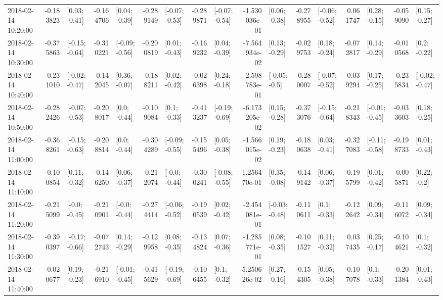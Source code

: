 \begin{tabular}{lrlrlrlrlrlrlrlrl}
2018-02-14 10:20:00 & -0.183823 &   [0.03; -0.41] & -0.164706 &   [0.04; -0.39] & -0.289149 &  [-0.07; -0.53] & -0.289871 &  [-0.07; -0.54] & -1.530036e-01 &   [0.06; -0.38] & -0.278955 &  [-0.06; -0.52] &  0.061747 &   [0.28; -0.15] & -0.059090 &   [0.15; -0.27] \\
2018-02-14 10:30:00 & -0.375863 &  [-0.15; -0.64] & -0.310221 &  [-0.09; -0.56] & -0.200819 &   [0.01; -0.43] & -0.169232 &   [0.04; -0.39] & -7.564934e-02 &   [0.13; -0.29] & -0.029753 &   [0.18; -0.24] & -0.072817 &   [0.14; -0.29] & -0.010568 &    [0.2; -0.22] \\
2018-02-14 10:40:00 & -0.231010 &  [-0.02; -0.47] &  0.142045 &   [0.36; -0.07] & -0.188211 &   [0.02; -0.42] &  0.026398 &   [0.24; -0.18] & -2.598783e-01 &   [-0.05; -0.5] & -0.280007 &  [-0.07; -0.52] & -0.039294 &   [0.17; -0.25] & -0.235834 &  [-0.02; -0.47] \\
2018-02-14 10:50:00 & -0.282426 &  [-0.07; -0.53] & -0.208017 &    [0.0; -0.44] & -0.109084 &    [0.1; -0.33] & -0.413237 &  [-0.19; -0.69] & -6.173205e-02 &   [0.15; -0.28] & -0.373076 &  [-0.15; -0.64] & -0.218343 &  [-0.01; -0.45] & -0.033603 &   [0.18; -0.25] \\
2018-02-14 11:00:00 & -0.368261 &  [-0.15; -0.63] & -0.208814 &    [0.0; -0.44] & -0.304289 &  [-0.09; -0.55] & -0.155496 &   [0.05; -0.38] & -1.566015e-02 &   [0.19; -0.23] & -0.180638 &   [0.03; -0.41] & -0.327083 &  [-0.11; -0.58] & -0.198733 &   [0.01; -0.43] \\
2018-02-14 11:10:00 & -0.100854 &   [0.11; -0.32] & -0.146250 &   [0.06; -0.37] & -0.212074 &   [-0.0; -0.44] & -0.300241 &  [-0.08; -0.55] &  1.256470e-01 &   [0.35; -0.08] & -0.149142 &   [0.06; -0.37] & -0.195799 &   [0.01; -0.42] &  0.005871 &    [0.22; -0.2] \\
2018-02-14 11:20:00 & -0.215099 &   [-0.0; -0.45] & -0.210901 &   [-0.0; -0.44] & -0.274414 &  [-0.06; -0.52] & -0.190539 &   [0.02; -0.42] & -2.454081e-01 &  [-0.03; -0.48] & -0.110611 &    [0.1; -0.33] & -0.122642 &   [0.09; -0.34] & -0.116072 &   [0.09; -0.34] \\
2018-02-14 11:30:00 & -0.390397 &  [-0.17; -0.66] & -0.072743 &   [0.14; -0.29] & -0.129958 &   [0.08; -0.35] & -0.134824 &   [0.07; -0.36] & -1.285771e-01 &   [0.08; -0.35] & -0.101527 &   [0.11; -0.32] &  0.037435 &   [0.25; -0.17] & -0.104621 &    [0.1; -0.32] \\
2018-02-14 11:40:00 & -0.020677 &   [0.19; -0.23] & -0.216910 &  [-0.01; -0.45] & -0.415629 &  [-0.19; -0.69] & -0.106455 &    [0.1; -0.32] &  5.250626e-02 &   [0.27; -0.16] & -0.154305 &   [0.05; -0.38] & -0.107078 &    [0.1; -0.33] & -0.201384 &   [0.01; -0.43] \\

\end{tabular}

